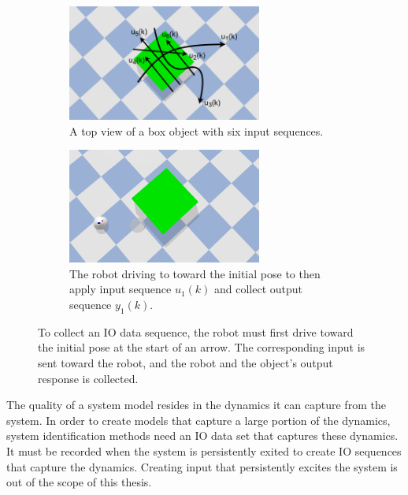 \begin{figure}[H]\ContinuedFloat
    \centering
    \begin{subfigure}{\textwidth}
    \centering
    \includegraphics[width=0.7\textwidth]{figures/required_background/collect_io_data_object}
    \caption{A top view of a box object with six input sequences.}%
    \label{subfig:collect_io_object_arrows}
    \end{subfigure}

    \begin{subfigure}{\textwidth}
    \centering
    \includegraphics[width=0.7\textwidth]{figures/required_background/collect_io_data_obj_and_robot}
    \caption{The robot driving to toward the initial pose to then apply input sequence $u_1(k)$ and collect output sequence $y_1(k)$.}%
    \label{subfig:collect_io_object_goto_init}
    \end{subfigure}
    \caption{To collect an \ac{IO} data sequence, the robot must first drive toward the initial pose at the start of an arrow. The corresponding input is sent toward the robot, and the robot and the object's output response is collected.}%
    \label{fig:collect_io_object}
\end{figure}

The quality of a system model resides in the dynamics it can capture from the system. In order to create models that capture a large portion of the dynamics, system identification methods need an \ac{IO} data set that captures these dynamics. It must be recorded when the system is persistently exited to create \ac{IO} sequences that capture the dynamics. Creating input that persistently excites the system is out of the scope of this thesis.\bs

